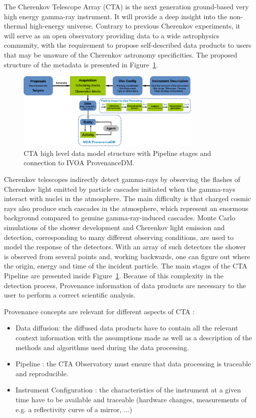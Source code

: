 The Cherenkov Telescope Array (CTA) is the next generation ground-based very high energy gamma-ray instrument. It will provide a deep insight into the non-thermal high-energy universe. Contrary to previous Cherenkov experiments, it will serve as an open observatory providing data to a wide astrophysics community, with the requirement to propose self-described data products to users that may be unaware of the Cherenkov astronomy specificities. The proposed structure of the metadata is presented in Figure~\ref{fig:cta_dm}.

\begin{figure}
\centering
\includegraphics[width=0.8\textwidth]{CTA_DM_high_level.png}
\caption{CTA high level data model structure with Pipeline stages and connection to IVOA ProvenanceDM.}
\label{fig:cta_dm}
\end{figure}

Cherenkov telescopes indirectly detect gamma-rays by observing the flashes of Cherenkov light emitted by particle cascades initiated when the gamma-rays interact with nuclei in the atmosphere. The main difficulty  is that charged cosmic rays also produce such cascades in the atmosphere, which represent an enormous background compared to genuine gamma-ray-induced cascades. Monte Carlo  simulations of the shower development and Cherenkov light emission and detection, corresponding to many different  observing conditions, are used to model the response of the detectors.  With an array of such detectors the shower is observed  from several points and, working backwards, one can figure out where the origin, energy and time of the incident particle. The main stages of the CTA Pipeline are presented inside Figure~\ref{fig:cta_dm}. Because of this complexity in the detection process, Provenance information of data products are necessary to the user to perform a correct scientific analysis.

Provenance concepts are relevant for different aspects of CTA :
\begin{itemize}
\item Data diffusion: the diffused data products have to contain all the relevant context information with the assumptions made as well as a description of the methods and algorithms used during the data processing.
\item Pipeline : the CTA Observatory must ensure that data processing is traceable and reproducible.
\item Instrument Configuration : the characteristics of the instrument at a given time have to be available and traceable (hardware changes, measurements of e.g. a reflectivity curve of a mirror, ...)
\end{itemize}

